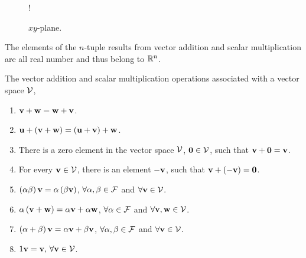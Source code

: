 \begin{figure}
    \centering
    \resizebox {0.7\columnwidth} {!} {
    }
    \caption{$xy$-plane.}
    \label{fig:xyplane}
\end{figure}

The elements of the $n$-tuple results from vector addition and scalar multiplication are all real number and thus belong to $\mathbb{R}^n$. 

The vector addition and scalar multiplication operations associated with a vector space $\mathcal{V}$,
\begin{enumerate}
    \item $\mathbf{v} + \mathbf{w} = \mathbf{w} + \mathbf{v}$.
    \item $\mathbf{u} + \left( \mathbf{v} + \mathbf{w} \right) = \left( \mathbf{u} + \mathbf{v} \right) + \mathbf{w}$.
    \item There is a zero element in the vector space $\mathcal{V}$, $\mathbf{0} \in \mathcal{V}$, such that $\mathbf{v} + \mathbf{0} = \mathbf{v}$.
    \item For every $\mathbf{v} \in \mathcal{V}$, there is an element $-\mathbf{v}$, such that $\mathbf{v} + \left( -\mathbf{v}\right) = \mathbf{0}$.
    \item $\left( \alpha \beta \right) \mathbf{v} = \alpha \left( \beta \mathbf{v}\right)$, $\forall \alpha, \beta \in \mathcal{F}$ and $\forall \mathbf{v} \in \mathcal{V}$.
    \item $\alpha \left( \mathbf{v} + \mathbf{w} \right)  = \alpha \mathbf{v} + \alpha \mathbf{w}$, $\forall \alpha \in \mathcal{F}$ and $\forall \mathbf{v},\mathbf{w} \in \mathcal{V}$.
    \item $\left( \alpha + \beta \right) \mathbf{v} = \alpha \mathbf{v} + \beta \mathbf{v}$, $\forall \alpha, \beta \in \mathcal{F}$ and $\forall \mathbf{v} \in \mathcal{V}$.
    \item $1 \mathbf{v} = \mathbf{v}, \, \forall \mathbf{v} \in \mathcal{V}$.
\end{enumerate}

